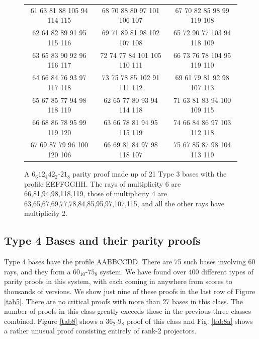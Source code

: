 \begin{figure}[ht]
\centering %
\begin{tabular}{|c | c |c |} %
\hline %
61	63	81	88	105	94	114	115&68	70	88	80	97	101	106	107&67	70	82	85	98	99	119	108\\
62	64	82	89	91	95	115	116&69	71	89	81	98	102	107	108&65	72	90	77	103	94	118	109\\
63	65	83	90	92	96	116	117&72	74	77	84	101	105	110	111&66	73	76	78	104	95	119	110\\
64	66	84	76	93	97	117	118&73	75	78	85	102	91	111	112&69	61	79	81	92	98	107	113\\
65	67	85	77	94	98	118	119&62	65	77	80	93	94	114	118&71	63	81	83	94	100	109	115\\
66	68	86	78	95	99	119	120&63	66	78	81	94	95	115	119&74	66	84	86	97	103	112	118\\
67	69	87	79	96	100	120	106&66	69	81	84	97	98	118	107&75	67	85	87	98	104	113	119\\
\hline
\end{tabular}
\caption{A $6_{6}12_{4}42_{2}$-$21_{8}$ parity proof made up of 21 Type 3 bases with the profile EEFFGGHH. The rays of multiplicity 6 are 66,81,94,98,118,119, those of multiplicity 4 are 63,65,67,69,77,78,84,85,95,97,107,115, and all the other rays have multiplicity 2.}
\label{tab7}
\end{figure}

{\bf \subsection{\label{subsec:type3} Type 4 Bases and their parity proofs }}

Type 4 bases have the profile AABBCCDD. There are 75 such bases involving 60 rays, and they form a $60_{10}$-$75_{8}$ system. We have found over 400 different types of parity proofs in this system, with each coming in anywhere from scores to thousands of versions. We show just nine of these proofs in the last row of Figure \ref{tab5}. There are no critical proofs with more than 27 bases in this class. The number of proofs in this class greatly exceeds those in the previous three classes combined. Figure \ref{tab8} shows a $36_{2}$-$9_{8}$  proof of this class and Fig. \ref{tab8a} shows a rather unusual proof consisting entirely of rank-2 projectors.\\

